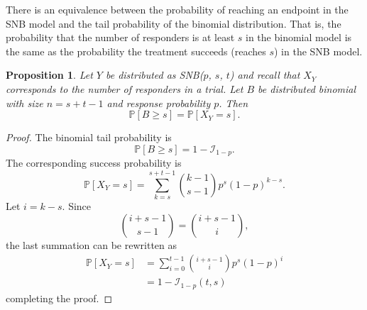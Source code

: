 \documentclass[review]{elsarticle}
\newtheorem{prop}{Proposition}
\begin{document}
There is an equivalence between the probability of reaching an endpoint 
in the SNB model and the tail probability of the binomial distribution.
That is, the probability that the number of responders is at least $s$ in the 
binomial model is the same as the probability the treatment succeeds 
(reaches $s$) in the SNB 
model.
\begin{prop} \label{binomial_tail}
Let $Y$ be distributed as SNB($p$, $s$, $t$) and recall that $X_Y$ corresponds
to the number of responders in a trial. Let 
$B$ be distributed binomial with size $n=s+t-1$ and response probability
$p$. Then
\begin{equation}
\mathbb{P}[B \geq s] = \mathbb{P} [X_Y = s].
\end{equation}
\end{prop}
\begin{proof}
The binomial tail probability is
\begin{equation*}
\mathbb{P}[B \geq s] = 1 - \mathcal{I}_{1-p}.
\end{equation*}
The corresponding success probability is
\begin{equation*}
\mathbb{P} [X_Y = s] 
  = \sum_{k=s}^{s+t-1} {k-1 \choose s-1} p^s (1-p)^{k-s}.
\end{equation*}
Let $i=k-s$. Since
\begin{equation*}
{i+s-1 \choose s-1} = {i+s-1 \choose i},
\end{equation*}
the last summation can be rewritten as
\begin{align}
\mathbb{P} [X_Y = s] &= \sum_{i=0}^{t-1} {i+s-1 \choose i} p^s (1-p)^i\\
  &= 1 - \mathcal{I}_{1-p}(t, s)
\end{align}
completing the proof.
\end{proof}
\end{document}
